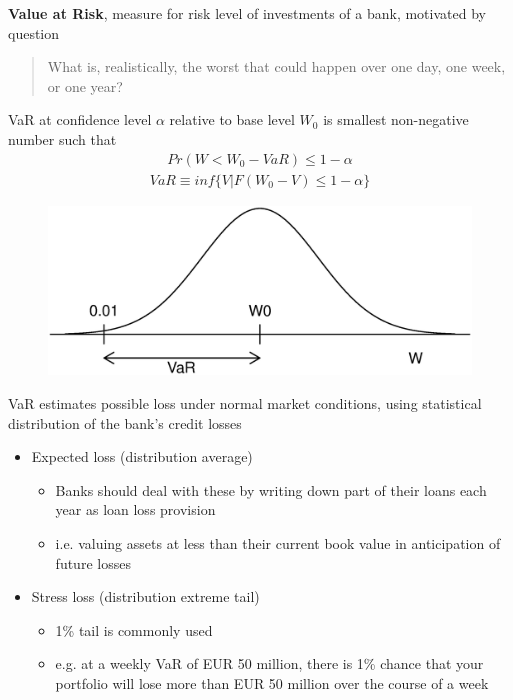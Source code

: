 \documentclass{beamer}
\begin{document}
\begin{frame} 
  \textbf{Value at Risk}, measure for risk level of investments of a bank, motivated by question
  \begin{quote}
    What is, realistically, the worst that could happen over one day, one week, or one year?
  \end{quote}
  VaR at confidence level $\alpha$ relative to base level $W_0$ is smallest non-negative number such that 
  \begin{align}
    Pr(W<W_0-VaR)\leq 1-\alpha
  \end{align}
  \begin{align}
    VaR \equiv inf\{V|F(W_0-V)\leq1-\alpha\}
  \end{align}
\end{frame}

\begin{frame}
  \begin{figure}
    \includegraphics[scale=.3]{VaR.eps}
  \end{figure}
\end{frame}


\begin{frame}
  VaR estimates possible loss under normal market conditions, using statistical distribution of the bank's credit losses
\begin{itemize}
  \item Expected loss (distribution average) 
  \begin{itemize}
    \item Banks should deal with these by writing down part of their loans each year as loan loss provision
    \item i.e. valuing assets at less than their current book value in anticipation of future losses
  \end{itemize}
  \medskip
  \item Stress loss (distribution extreme tail)
  \begin{itemize}
    \item 1\% tail is commonly used
    \item e.g. at a weekly VaR of EUR 50 million, there is  1\% chance that your portfolio will lose more than EUR 50 million over the course of a week 
  \end{itemize}
\end{itemize}
\end{frame}
\end{document}
